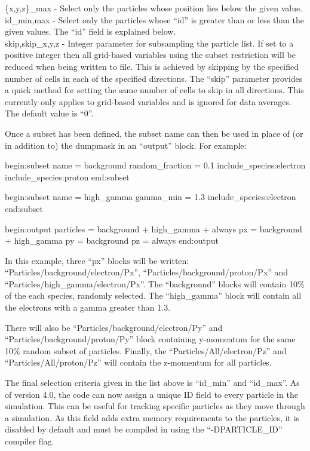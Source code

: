 {\emphtext \{x,y,z\}\_max} - Select only the particles whose position lies
  below the given value.\\

{\emphtext id\_{min,max}} - Select only the particles whose ``id'' is greater
  than or less than the given values. The ``id'' field is explained below.\\

{\emphtext skip,skip\_{x,y,z}} - Integer parameter for subsampling the particle
  list. If set to a positive integer then all grid-based variables using the
  subset restriction will be reduced when being written to file. This is
  achieved by skipping by the specified number of cells in each of the
  specified directions. The ``skip'' parameter provides a quick method for
  setting the same number of cells to skip in all directions.
  This currently only applies to grid-based variables and is ignored for
  data averages. The default value is ``0''.

Once a subset has been defined, the subset name can then be used in place of
(or in addition to) the dumpmask in an ``output'' block. For example:
{\samepage
\begin{boxverbatim}
begin:subset
   name = background
   random_fraction = 0.1
   include_species:electron
   include_species:proton
end:subset

begin:subset
   name = high_gamma
   gamma_min = 1.3
   include_species:electron
end:subset

begin:output
   particles = background + high_gamma + always
   px = background + high_gamma
   py = background
   pz = always
end:output
\end{boxverbatim}
}

In this example, three ``px'' blocks will be written:
``Particles/background/electron/Px'', ``Particles/background/proton/Px''
and ``Particles/high\_gamma/electron/Px''.
The ``background'' blocks will contain 10\% of the each species, randomly
selected.
The ``high\_gamma'' block will contain all the electrons with a gamma
greater than 1.3.

There will also be ``Particles/background/electron/Py'' and
``Particles/background/proton/Py'' block containing y-momentum for the same
10\% random subset of particles.
Finally, the ``Particles/All/electron/Pz'' and ``Particles/All/proton/Pz'' will
contain the z-momentum for all particles.

The final selection criteria given in the list above is ``id\_min'' and
``id\_max''. As of {\EPOCH} version 4.0, the code can now assign a unique
ID field to every particle in the simulation. This can be useful for
tracking specific particles as they move through a simulation. As this
field adds extra memory requirements to the particles, it is disabled by
default and must be compiled in using the ``-DPARTICLE\_ID'' compiler flag.

